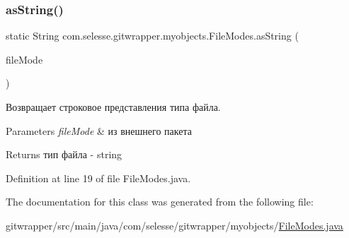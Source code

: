 \subsubsection{\texorpdfstring{as\+String()}{asString()}}
{\footnotesize\ttfamily static String com.\+selesse.\+gitwrapper.\+myobjects.\+File\+Modes.\+as\+String (\begin{DoxyParamCaption}\item[{File\+Mode}]{file\+Mode }\end{DoxyParamCaption})\hspace{0.3cm}{\ttfamily [static]}}

Возвращает строковое представления типа файла.


\begin{DoxyParams}{Parameters}
{\em file\+Mode} & из внешнего пакета \\
\hline
\end{DoxyParams}
\begin{DoxyReturn}{Returns}
тип файла -\/ string 
\end{DoxyReturn}


Definition at line 19 of file File\+Modes.\+java.



The documentation for this class was generated from the following file\+:\begin{DoxyCompactItemize}
\item 
gitwrapper/src/main/java/com/selesse/gitwrapper/myobjects/\hyperlink{_file_modes_8java}{File\+Modes.\+java}\end{DoxyCompactItemize}
